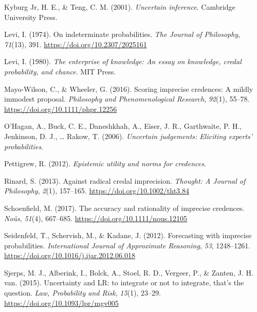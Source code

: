 \documentclass[
  10pt,
  dvipsnames,enabledeprecatedfontcommands]{scrartcl}
\newlength{\cslhangindent}
\newlength{\cslentryspacingunit} %
\newenvironment{CSLReferences}[2] %
 {%
  \setlength{\parindent}{0pt}
  \ifodd #1
  \let\oldpar\par
  \def\par{\hangindent=\cslhangindent\oldpar}
  \fi
  \setlength{\parskip}{#2\cslentryspacingunit}
 }%
 {}
\begin{document}
\begin{CSLReferences}{1}{0}
\leavevmode{}%
Kyburg Jr, H. E., \& Teng, C. M. (2001). \emph{Uncertain inference}.
Cambridge University Press.

\leavevmode{}%
Levi, I. (1974). On indeterminate probabilities. \emph{The Journal of
Philosophy}, \emph{71}(13), 391. \url{https://doi.org/10.2307/2025161}

\leavevmode{}%
Levi, I. (1980). \emph{The enterprise of knowledge: An essay on
knowledge, credal probability, and chance}. MIT Press.

\leavevmode{}%
Mayo-Wilson, C., \& Wheeler, G. (2016). Scoring imprecise credences: A
mildly immodest proposal. \emph{Philosophy and Phenomenological
Research}, \emph{92}(1), 55--78.
\url{https://doi.org/10.1111/phpr.12256}

\leavevmode{}%
O'Hagan, A., Buck, C. E., Daneshkhah, A., Eiser, J. R., Garthwaite, P.
H., Jenkinson, D. J., \ldots{} Rakow, T. (2006). \emph{Uncertain
judgements: Eliciting experts' probabilities}.

\leavevmode{}%
Pettigrew, R. (2012). \emph{Epistemic utility and norms for credences}.

\leavevmode{}%
Rinard, S. (2013). Against radical credal imprecision. \emph{Thought: A
Journal of Philosophy}, \emph{2}(1), 157--165.
\url{https://doi.org/10.1002/tht3.84}

\leavevmode{}%
Schoenfield, M. (2017). The accuracy and rationality of imprecise
credences. \emph{Noûs}, \emph{51}(4), 667--685.
\url{https://doi.org/10.1111/nous.12105}

\leavevmode{}%
Seidenfeld, T., Schervish, M., \& Kadane, J. (2012). Forecasting with
imprecise probabilities. \emph{International Journal of Approximate
Reasoning}, \emph{53}, 1248--1261.
\url{https://doi.org/10.1016/j.ijar.2012.06.018}

\leavevmode{}%
Sjerps, M. J., Alberink, I., Bolck, A., Stoel, R. D., Vergeer, P., \&
Zanten, J. H. van. (2015). {Uncertainty and LR: to integrate or not to
integrate, that's the question}. \emph{Law, Probability and Risk},
\emph{15}(1), 23--29. \url{https://doi.org/10.1093/lpr/mgv005}


\end{CSLReferences}
\end{document}
